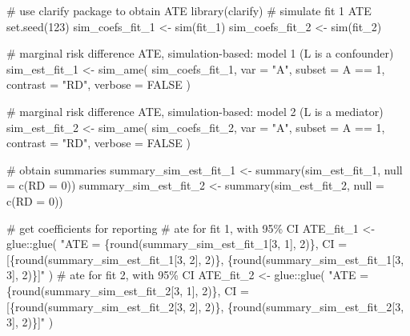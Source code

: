\documentclass[
  singlecolumn]{article}
\newenvironment{Shaded}{\begin{snugshade}}{\end{snugshade}}
\newcommand{\AttributeTok}[1]{\textcolor[rgb]{0.40,0.45,0.13}{#1}}
\newcommand{\CommentTok}[1]{\textcolor[rgb]{0.37,0.37,0.37}{#1}}
\newcommand{\ConstantTok}[1]{\textcolor[rgb]{0.56,0.35,0.01}{#1}}
\newcommand{\DecValTok}[1]{\textcolor[rgb]{0.68,0.00,0.00}{#1}}
\newcommand{\FunctionTok}[1]{\textcolor[rgb]{0.28,0.35,0.67}{#1}}
\newcommand{\NormalTok}[1]{\textcolor[rgb]{0.00,0.23,0.31}{#1}}
\newcommand{\OtherTok}[1]{\textcolor[rgb]{0.00,0.23,0.31}{#1}}
\newcommand{\SpecialCharTok}[1]{\textcolor[rgb]{0.37,0.37,0.37}{#1}}
\newcommand{\StringTok}[1]{\textcolor[rgb]{0.13,0.47,0.30}{#1}}
\begin{document}
\begin{Shaded}
\begin{Highlighting}[]
\CommentTok{\# use \textasciigrave{}clarify\textasciigrave{} package to obtain ATE}
\FunctionTok{library}\NormalTok{(clarify)}
\CommentTok{\# simulate fit 1 ATE}
\FunctionTok{set.seed}\NormalTok{(}\DecValTok{123}\NormalTok{)}
\NormalTok{sim\_coefs\_fit\_1 }\OtherTok{\textless{}{-}} \FunctionTok{sim}\NormalTok{(fit\_1)}
\NormalTok{sim\_coefs\_fit\_2 }\OtherTok{\textless{}{-}} \FunctionTok{sim}\NormalTok{(fit\_2)}

\CommentTok{\# marginal risk difference ATE, simulation{-}based: model 1 (L is a confounder)}
\NormalTok{sim\_est\_fit\_1 }\OtherTok{\textless{}{-}}
  \FunctionTok{sim\_ame}\NormalTok{(}
\NormalTok{    sim\_coefs\_fit\_1,}
    \AttributeTok{var =} \StringTok{"A"}\NormalTok{,}
    \AttributeTok{subset =}\NormalTok{ A }\SpecialCharTok{==} \DecValTok{1}\NormalTok{,}
    \AttributeTok{contrast =} \StringTok{"RD"}\NormalTok{,}
    \AttributeTok{verbose =} \ConstantTok{FALSE}
\NormalTok{  )}

\CommentTok{\# marginal risk difference ATE, simulation{-}based: model 2 (L is a mediator)}
\NormalTok{sim\_est\_fit\_2 }\OtherTok{\textless{}{-}}
  \FunctionTok{sim\_ame}\NormalTok{(}
\NormalTok{    sim\_coefs\_fit\_2,}
    \AttributeTok{var =} \StringTok{"A"}\NormalTok{,}
    \AttributeTok{subset =}\NormalTok{ A }\SpecialCharTok{==} \DecValTok{1}\NormalTok{,}
    \AttributeTok{contrast =} \StringTok{"RD"}\NormalTok{,}
    \AttributeTok{verbose =} \ConstantTok{FALSE}
\NormalTok{  )}

\CommentTok{\# obtain summaries}
\NormalTok{summary\_sim\_est\_fit\_1 }\OtherTok{\textless{}{-}} \FunctionTok{summary}\NormalTok{(sim\_est\_fit\_1, }\AttributeTok{null =} \FunctionTok{c}\NormalTok{(}\StringTok{\textasciigrave{}}\AttributeTok{RD}\StringTok{\textasciigrave{}} \OtherTok{=} \DecValTok{0}\NormalTok{))}
\NormalTok{summary\_sim\_est\_fit\_2 }\OtherTok{\textless{}{-}} \FunctionTok{summary}\NormalTok{(sim\_est\_fit\_2, }\AttributeTok{null =} \FunctionTok{c}\NormalTok{(}\StringTok{\textasciigrave{}}\AttributeTok{RD}\StringTok{\textasciigrave{}} \OtherTok{=} \DecValTok{0}\NormalTok{))}

\CommentTok{\# get coefficients for reporting}
\CommentTok{\# ate for fit 1, with 95\% CI}
\NormalTok{ATE\_fit\_1 }\OtherTok{\textless{}{-}}\NormalTok{ glue}\SpecialCharTok{::}\FunctionTok{glue}\NormalTok{(}
  \StringTok{"ATE =}
\StringTok{                        \{round(summary\_sim\_est\_fit\_1[3, 1], 2)\},}
\StringTok{                        CI = [\{round(summary\_sim\_est\_fit\_1[3, 2], 2)\},}
\StringTok{                        \{round(summary\_sim\_est\_fit\_1[3, 3], 2)\}]"}
\NormalTok{)}
\CommentTok{\# ate for fit 2, with 95\% CI}
\NormalTok{ATE\_fit\_2 }\OtherTok{\textless{}{-}}
\NormalTok{  glue}\SpecialCharTok{::}\FunctionTok{glue}\NormalTok{(}
    \StringTok{"ATE = \{round(summary\_sim\_est\_fit\_2[3, 1], 2)\},}
\StringTok{                        CI = [\{round(summary\_sim\_est\_fit\_2[3, 2], 2)\},}
\StringTok{                        \{round(summary\_sim\_est\_fit\_2[3, 3], 2)\}]"}
\NormalTok{  )}
\end{Highlighting}
\end{Shaded}
\end{document}
